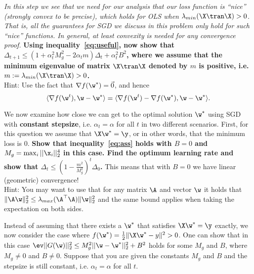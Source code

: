 \documentclass[preview]{standalone}
\begin{document}
\begin{Parts}






\Part \emph{In this step we see that we need for our analysis that our loss function is ``nice'' (strongly convex to be precise), which holds for OLS when $\lambda_{min}(\X\tran \X ) > 0$. That is, all the guarantees for SGD we discuss in this problem only hold for such ``nice'' functions. In general, at least convexity is needed for any convergence proof.} \textbf{Using inequality~\eqref{eq:useful}, now show that $\Delta_{t+1} \leq (1+\alpha_t^2 M_g^2 - 2\alpha_t m )\Delta_t + \alpha_t^2 B^2$, where we assume that the minimum eigenvalue of matrix $\X \tran \X$ denoted by $m$ is positive, i.e. $m:=\lambda_{min}(\X\tran \X ) > 0$. } \\

Hint: Use the fact that $\nabla f(\w^*) = \vec{0}$, and hence
\begin{equation*}
\langle \nabla f(\w^t), \w - \w^*\rangle = \langle \nabla f(\w^t) - \nabla f(\w^*), \w - \w^*\rangle.
\end{equation*}




\Part We now examine how close we can get to the optimal solution $\w^*$ using SGD with {\bf constant stepsize}, i.e. $\alpha_t = \alpha$ for all $t$ in two different scenarios. First, for this question we assume that $\X \w^* = \y$, or in other words, that the minimum loss is $0$. \textbf{Show that inequality~\eqref{eq:ass} holds with $B=0$ and $M_g = \max_i||\x_i||_2^4$ in this case. Find the optimum learning rate and show that $\Delta_t \leq (1-\frac{m^2}{M_g^2})^t \Delta_0$.} This means that with $B=0$ we have linear (geometric) convergence!\\

Hint: You may want to use that for any matrix $\A$ and vector $\w$ it holds that $\|\A \w\|_2^2 \leq \lambda_{max}(\A^\top \A) \|\w\|_2^2$ and the same bound applies when taking the expectation on both sides.



\Part Instead of assuming that there exists a $\w^*$ that satisfies $\X \w^* = \y$ exactly, we now consider the case where $f(\w^*) = \frac{1}{2}\|\X\w^* - y\|^2 >0$. One can show that in this case $\ev ||G(\w)||_2^2 \leq M_g^2 ||\w-\w^*||_2^2 + B^2$ holds for some $M_g$ and $B$, where $M_g \neq 0$ and $B \neq 0$. Suppose that you are given the constants $M_g$ and $B$ and the stepsize is still constant, i.e. $\alpha_t = \alpha$ for all $t$.


\end{Parts}
\end{document}
